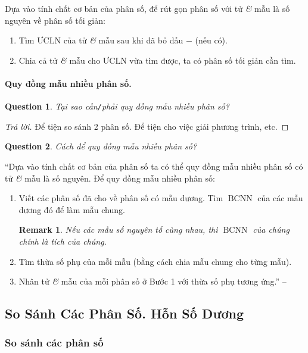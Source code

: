 \documentclass{article}
\numberwithin{equation}{section}
\newtheorem{question}{Question}[section]
\newtheorem{remark}{Remark}[section]
\begin{document}
Dựa vào tính chất cơ bản của phân số, để rút gọn phân số với tử \textit{\&} mẫu là số nguyên về phân số tối giản:
\begin{enumerate}
	\item Tìm $\mbox{ƯCLN}$ của tử \textit{\&} mẫu sau khi đã bỏ dấu $-$ (nếu có).
	\item Chia cả tử \textit{\&} mẫu cho $\mbox{ƯCLN}$ vừa tìm được, ta có phân số  tối giản cần tìm.
\end{enumerate}

\paragraph{Quy đồng mẫu nhiều phân số.}
\begin{question}
	Tại sao cần\emph{\texttt{/}}phải quy đồng mẫu nhiều phân số?
\end{question}

\begin{proof}[Trả lời]
	Để tiện so sánh 2 phân số. Để tiện cho việc giải phương trình, etc.
\end{proof}

\begin{question}
	Cách để quy đồng mẫu nhiều phân số?
\end{question}
``Dựa vào tính chất cơ bản của phân số ta có thể quy đồng mẫu nhiều phân số có tử \textit{\&} mẫu là số nguyên. Để quy đồng mẫu nhiều phân số:
\begin{enumerate}
	\item Viết các phân số đã cho về phân số có mẫu dương. Tìm $\operatorname{BCNN}$ của các mẫu dương đó để làm mẫu chung.
	\begin{remark}
		Nếu các mẫu số nguyên tố cùng nhau, thì $\operatorname{BCNN}$ của chúng chính là tích của chúng.
	\end{remark}
	\item Tìm thừa số phụ của mỗi mẫu (bằng cách chia mẫu chung cho từng mẫu).
	\item Nhân tử \textit{\&} mẫu của mỗi phân số ở Bước 1 với thừa số phụ tương ứng.'' -- \cite[p. 29]{Thai_Anh_Dat_Ha_Loan_Nam_Quang_Toan_6_tap_2}
\end{enumerate}

\subsection{So Sánh Các Phân Số. Hỗn Số Dương}

\subsubsection{So sánh các phân số}
\end{document}
